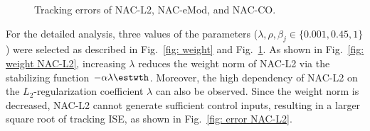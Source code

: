 \documentclass[letterpaper, 10 pt, conference]{ieeeconf}  %
\begin{document}
\begin{figure}[!t]      
    \centering
    \vspace{.1mm}
    \vspace{.1mm}
    \caption{Tracking errors of NAC-L2, NAC-eMod, and NAC-CO.}
    \label{fig: error}
\end{figure}

For the detailed analysis, three values of the parameters (\ie $\lambda,\rho,\beta_j\in\{0.001,0.45,1\}$) were selected as described in Fig.~\ref{fig: weight} and Fig.~\ref{fig: error}.
As shown in Fig.~\ref{fig: weight NAC-L2}, increasing $\lambda$ reduces the weight norm of NAC-L2 via the stabilizing function $-\alpha\lambda{\estwth}$.
Moreover, the high dependency of NAC-L2 on the $L_2$-regularization coefficient $\lambda$ can also be observed.
Since the weight norm is decreased, NAC-L2 cannot generate sufficient control inputs, resulting in a larger square root of tracking ISE, as shown in Fig.~\ref{fig: error NAC-L2}.
\end{document}
